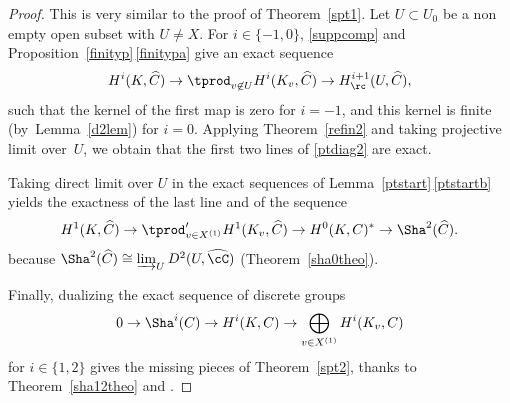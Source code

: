 \begin{proof} This is very similar to the proof of Theorem~\ref{spt1}.
Let $U \subset U_0$ be a non empty open subset with $U \neq X$.
For $i \in \{-1, 0\}$, \eqref{suppcomp} and Proposition~\ref{finityp}\,\eqref{finitypa}
give an exact sequence\vspace*{-3pt}\enlargethispage{.5\baselineskip}%
\[
H^i(K,\widehat C) \to \tprod_{v \not \in U} H^i(K_v,\widehat C) \to
H^{i+1}_\rc(U,\widehat C),
\]
such that the kernel of the first map is zero for $i=-1$, and this kernel
is finite
(by~Lemma~\ref{d2lem}) for $i=0$. Applying Theorem~\ref{refin2} and
taking projective limit over~$U$, we obtain that the first two lines of
\eqref{ptdiag2} are exact.

Taking direct limit over $U$ in the exact sequences of Lemma~\ref{ptstart}\,\eqref{ptstartb} yields the exactness of the last line and of the sequence\vspace*{-3pt}
\[
H^1(K,\widehat C) \to \tprod^{\prime}_{v \in X^{(1)}} H^1(K_v,\widehat C) \to
H^0(K,C)^* \to \Sha^2(\widehat C).
\]
because $\Sha^2(\widehat C) \cong \varinjlim_U D^2(U,\widehat \cC)$
(\cf Theorem~\ref{sha0theo}).

Finally, dualizing the exact sequence of discrete groups\vspace*{-3pt}
\[
0 \to \Sha^i(C) \to H^i(K,C) \to
\bigoplus_{v \in X^{(1)}} H^i(K_v,C)
\]
for $i \in \{1, 2\}$
gives the missing pieces of Theorem~\ref{spt2}, thanks to
Theorem~\ref{sha12theo} and \cite[Th.\,3.1 \& 3.3]{demphd}.
\end{proof}

